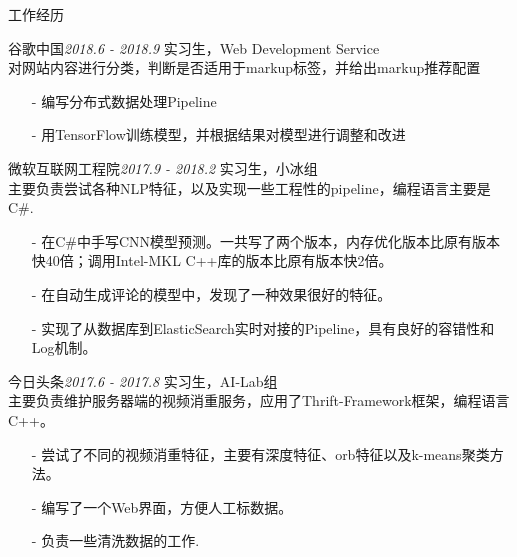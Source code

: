 \documentclass{resume} %
\begin{document}
\begin{rSection}{工作经历}

\begin{rSubsection}{谷歌中国}{\em 2018.6 - 2018.9}
{实习生，Web Development Service \\}
{对网站内容进行分类，判断是否适用于markup标签，并给出markup推荐配置}
\item[]
\begin{itemize}
\setlength\itemsep{-0.5em}
\item[-] 编写分布式数据处理Pipeline
\item[-] 用TensorFlow训练模型，并根据结果对模型进行调整和改进
\end{itemize}
\end{rSubsection}

\begin{rSubsection}{微软互联网工程院}{\em 2017.9 - 2018.2}
{实习生，小冰组 \\}
{主要负责尝试各种NLP特征，以及实现一些工程性的pipeline，编程语言主要是C\#.}
\item[]
\begin{itemize}
\setlength\itemsep{-0.5em}
\item[-] 在C\#中手写CNN模型预测。一共写了两个版本，内存优化版本比原有版本快40倍；调用Intel-MKL C++库的版本比原有版本快2倍。
\item[-] 在自动生成评论的模型中，发现了一种效果很好的特征。
\item[-] 实现了从数据库到ElasticSearch实时对接的Pipeline，具有良好的容错性和Log机制。
\end{itemize}
\end{rSubsection}


\begin{rSubsection}{今日头条}{\em 2017.6 - 2017.8}
{实习生，AI-Lab组 \\}
{主要负责维护服务器端的视频消重服务，应用了Thrift-Framework框架，编程语言C++。}
\item[]
\begin{itemize}
\setlength\itemsep{-0.5em}
\item[-] 尝试了不同的视频消重特征，主要有深度特征、orb特征以及k-means聚类方法。
\item[-] 编写了一个Web界面，方便人工标数据。
\item[-] 负责一些清洗数据的工作.
\end{itemize}
\end{rSubsection}


\end{rSection}
\end{document}
